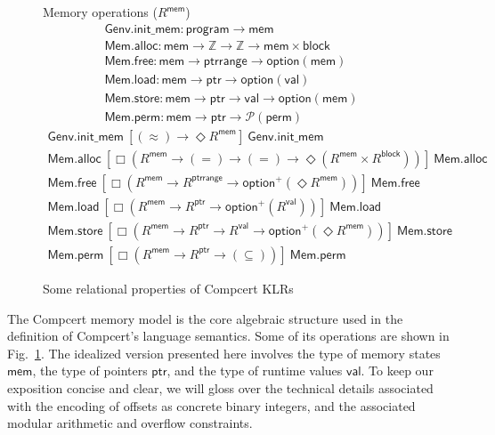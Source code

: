 \documentclass[acmsmall,anonymous]{acmart}
\newcommand{\kw}[1]{\ensuremath{ \textsf{#1} }}
\newcommand{\ifr}[1]{\ [{#1}]\ }
\begin{document}
\begin{figure}
  \vspace{2em}
  Memory operations ($R^\kw{mem}$)
  \vspace{1em}
  \[
    \begin{array}{c}
      \kw{Genv.init\_mem} :
        \kw{program} \rightarrow \kw{mem}
      \\
      \kw{Mem.alloc} :
        \kw{mem} \rightarrow \mathbb{Z} \rightarrow \mathbb{Z} \rightarrow
        \kw{mem} \times \kw{block}
      \\
      \kw{Mem.free} :
        \kw{mem} \rightarrow
        \kw{ptrrange} \rightarrow
        \kw{option}(\kw{mem})
      \\
      \kw{Mem.load} :
        \kw{mem} \rightarrow \kw{ptr} \rightarrow \kw{option}(\kw{val})
      \\
      \kw{Mem.store} :
        \kw{mem} \rightarrow \kw{ptr} \rightarrow \kw{val} \rightarrow \kw{option}(\kw{mem})
      \\
      \kw{Mem.perm} :
        \kw{mem} \rightarrow \kw{ptr} \rightarrow \mathcal{P}(\kw{perm})
    \end{array}
  \]
  \vspace{0.5em}
  \[
    \begin{array}{c}
      \kw{Genv.init\_mem}
      \ifr{(\approx) \rightarrow \Diamond R^\kw{mem}}
      \kw{Genv.init\_mem}
      \\
      \kw{Mem.alloc}
      \ifr{\Box(R^\kw{mem} \rightarrow (=) \rightarrow (=) \rightarrow
        \Diamond (R^\kw{mem} \times R^\kw{block}))}
      \kw{Mem.alloc}
      \\
      \kw{Mem.free}
      \ifr{\Box(R^\kw{mem} \rightarrow R^\kw{ptrrange} \rightarrow
        \kw{option}^+(\Diamond R^\kw{mem}))}
      \kw{Mem.free}
      \\
      \kw{Mem.load}
      \ifr{\Box(R^\kw{mem} \rightarrow R^\kw{ptr} \rightarrow
        \kw{option}^+(R^\kw{val}))}
      \kw{Mem.load}
      \\
      \kw{Mem.store}
      \ifr{\Box(R^\kw{mem} \rightarrow R^\kw{ptr} \rightarrow R^\kw{val} \rightarrow
        \kw{option}^+(\Diamond R^\kw{mem}))}
      \kw{Mem.store}
      \\
      \kw{Mem.perm}
      \ifr{\Box(R^\kw{mem} \rightarrow R^\kw{ptr} \rightarrow (\subseteq))}
      \kw{Mem.perm}
    \end{array}
  \]
  \caption{Some relational properties of Compcert KLRs}
  \label{fig:cklr}
\end{figure}

The Compcert memory model \citep{compcertmmv2}
is the core algebraic structure
used in the definition of Compcert's language semantics.
Some of its operations
are shown in Fig.~\ref{fig:cklr}.
The idealized version presented here
involves
the type of memory states \kw{mem},
the type of pointers \kw{ptr}, and
the type of runtime values \kw{val}.
To keep our exposition concise and clear,
we will gloss over the technical details
associated with the encoding of offsets
as concrete binary integers,
and the associated modular arithmetic and overflow constraints.
\end{document}
